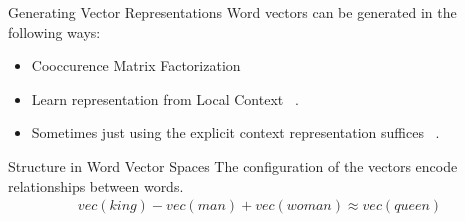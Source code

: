 \begin{frame}{Generating Vector Representations}
  Word vectors can be generated in the following ways:
  \begin{itemize}[<+->]
  \item Cooccurence Matrix Factorization~\cite{Deerwester} %
  \item Learn representation from Local Context ~\cite{Mikolov13a}.%
  \item Sometimes just using the explicit context representation suffices ~\cite{Levy14}.
  \end{itemize}
\end{frame}

\begin{frame}{Structure in Word Vector Spaces}
  The configuration of the vectors encode relationships between words.
  \begin{align*}
    vec(king) - vec(man) + vec(woman) \approx vec(queen)
  \end{align*}
  \pause
\end{frame}

